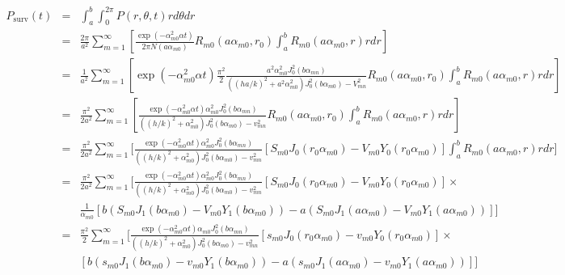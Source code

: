 \documentclass{article}
\begin{document}
\begin{eqnarray}
    P_{\mathrm{surv}}(t) &=& \int_a^b \int_0^{2\pi} P(r, \theta, t) rd\theta dr
\nonumber\\
    &=& \frac{2\pi}{a^2} \sum_{m=1}^{\infty} \left[
         \frac{\exp(-\alpha_{m0}^2\alpha t)}{2\pi N(a\alpha_{m0})}
         R_{m0}(a\alpha_{m0}, r_0) \int_a^b R_{m0}(a\alpha_{m0}, r) rdr\right]
\nonumber\\
    &=& \frac{1}{a^2} \sum_{m=1}^{\infty} \left[
        \exp(-\alpha_{m0}^2\alpha t)\frac{\pi^2}{2}
        \frac{a^2\alpha_{m0}^2 J_0^2(b\alpha_{mn})}{((ha/k)^2 + a^2\alpha_{m0}^2)J_0^2(b\alpha_{m0})-V_{mn}^2}
         R_{m0}(a\alpha_{m0}, r_0) \int_a^b R_{m0}(a\alpha_{m0}, r) rdr\right]
\nonumber\\
    &=& \frac{\pi^2}{2a^2} \sum_{m=1}^{\infty} \left[
        \frac{\exp(-\alpha_{m0}^2\alpha t)\alpha_{m0}^2 J_0^2(b\alpha_{mn})}
             {((h/k)^2 + \alpha_{m0}^2)J_0^2(b\alpha_{m0})-v_{mn}^2}
         R_{m0}(a\alpha_{m0}, r_0) \int_a^b R_{m0}(a\alpha_{m0}, r) rdr\right]
\nonumber\\
    &=& \frac{\pi^2}{2a^2} \sum_{m=1}^{\infty} \Bigg[
        \frac{\exp(-\alpha_{m0}^2\alpha t)\alpha_{m0}^2 J_0^2(b\alpha_{mn})}
             {((h/k)^2 + \alpha_{m0}^2)J_0^2(b\alpha_{m0})-v_{mn}^2}
        \left[S_{m0}J_0(r_0\alpha_{m0}) - V_{m0}Y_0(r_0\alpha_{m0})\right]
        \int_a^b R_{m0}(a\alpha_{m0}, r) rdr\Bigg]
\nonumber\\
    &=& \frac{\pi^2}{2a^2} \sum_{m=1}^{\infty} \Bigg[
        \frac{\exp(-\alpha_{m0}^2\alpha t)\alpha_{m0}^2 J_0^2(b\alpha_{mn})}
             {((h/k)^2 + \alpha_{m0}^2)J_0^2(b\alpha_{m0})-v_{mn}^2}
        \left[S_{m0}J_0(r_0\alpha_{m0}) - V_{m0}Y_0(r_0\alpha_{m0})\right] \times
\nonumber\\
    & & \frac{1}{\alpha_{m0}}\left[
        b(S_{m0}J_1(b\alpha_{m0}) - V_{m0}Y_1(b\alpha_{m0})) -
        a(S_{m0}J_1(a\alpha_{m0}) - V_{m0}Y_1(a\alpha_{m0}))
        \right]\Bigg]
\nonumber\\
    &=& \frac{\pi^2}{2} \sum_{m=1}^{\infty} \Bigg[
        \frac{\exp(-\alpha_{m0}^2\alpha t)\alpha_{m0} J_0^2(b\alpha_{mn})}
             {((h/k)^2 + \alpha_{m0}^2)J_0^2(b\alpha_{m0})-v_{mn}^2}
        \left[s_{m0}J_0(r_0\alpha_{m0}) - v_{m0}Y_0(r_0\alpha_{m0})\right] \times
\nonumber\\
    & & \left[
        b(s_{m0}J_1(b\alpha_{m0}) - v_{m0}Y_1(b\alpha_{m0})) -
        a(s_{m0}J_1(a\alpha_{m0}) - v_{m0}Y_1(a\alpha_{m0}))
        \right]\Bigg]
\nonumber
\end{eqnarray}
\end{document}
